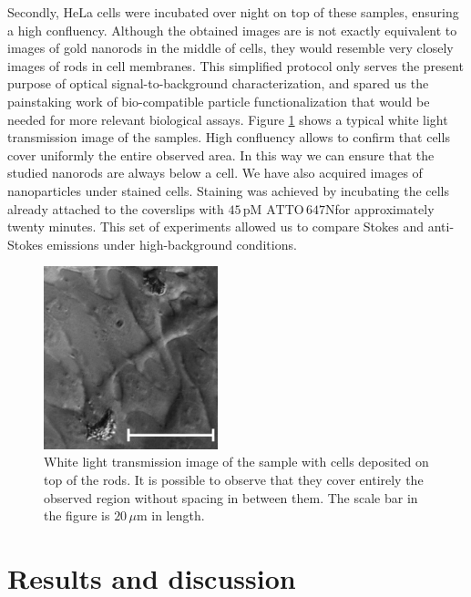 \documentclass[journal=nalefd,manuscript=letter]{achemso}
\newcommand{\um}{\ensuremath{\,\mu\textrm{m}}}
\newcommand{\pM}{\ensuremath{\,\textrm{pM}}}
\newcommand{\atto}{\ensuremath{\textrm{ATTO}\,647\textrm{N}}}
\begin{document}
Secondly, HeLa cells were incubated over night on top of these samples, ensuring
a high confluency. Although the obtained images are is not exactly equivalent to images
of gold nanorods in the middle of cells, they would resemble very closely  images of rods
in cell membranes. This simplified protocol only serves the present purpose of optical
signal-to-background characterization, and spared us the painstaking work of bio-compatible particle
functionalization that would be needed for more relevant biological assays. Figure
\ref{fig:white-light} shows a typical white light transmission image of the
samples. High confluency allows to confirm that cells cover uniformly the
entire observed area. In this way we can ensure that the studied nanorods are
always below a cell. We have also acquired images of nanoparticles under stained
cells. Staining was achieved by incubating the cells already attached to the
coverslips with $45\pM$ \atto for approximately twenty minutes. This set
of experiments allowed us to compare Stokes and anti-Stokes emissions under
high-background conditions.

\begin{figure}[htp]
\centering
	\includegraphics[width=0.45\textwidth]{Figures/03_White_Light/white_light_scale.png}
	\caption{White light transmission image of the sample with cells deposited on
	top of the rods. It is possible to observe that they cover entirely the
	observed region without spacing in between them. The scale bar in the figure
	is $20\um$ in length.}
	\label{fig:white-light}
\end{figure}


\section{Results and discussion}
\end{document}
